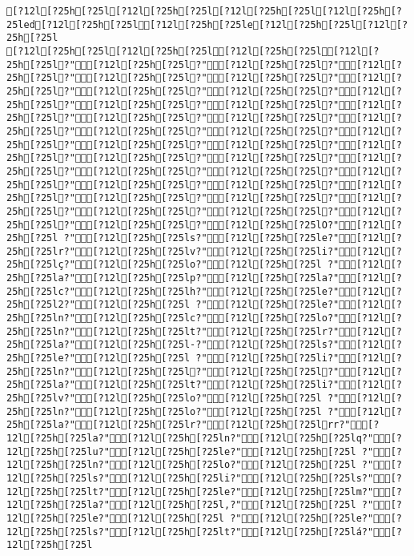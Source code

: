 \documentclass{scrartcl}
\begin{document}
\begin{Verbatim}
[?12l[?25h[?25l[?12l[?25h[?25l[?12l[?25h[?25l[?12l[?25h[?25led[?12l[?25h[?25l[?12l[?25h[?25le[?12l[?25h[?25l[?12l[?25h[?25l
[?12l[?25h[?25l[?12l[?25h[?25l[?12l[?25h[?25l[?12l[?25h[?25l?"[?12l[?25h[?25l?"[?12l[?25h[?25l?"[?12l[?25h[?25l?"[?12l[?25h[?25l?"[?12l[?25h[?25l?"[?12l[?25h[?25l?"[?12l[?25h[?25l?"[?12l[?25h[?25l?"[?12l[?25h[?25l?"[?12l[?25h[?25l?"[?12l[?25h[?25l?"[?12l[?25h[?25l?"[?12l[?25h[?25l?"[?12l[?25h[?25l?"[?12l[?25h[?25l?"[?12l[?25h[?25l?"[?12l[?25h[?25l?"[?12l[?25h[?25l?"[?12l[?25h[?25l?"[?12l[?25h[?25l?"[?12l[?25h[?25l?"[?12l[?25h[?25l?"[?12l[?25h[?25l?"[?12l[?25h[?25l?"[?12l[?25h[?25l?"[?12l[?25h[?25l?"[?12l[?25h[?25l?"[?12l[?25h[?25l?"[?12l[?25h[?25l?"[?12l[?25h[?25l?"[?12l[?25h[?25l?"[?12l[?25h[?25l?"[?12l[?25h[?25l?"[?12l[?25h[?25l?"[?12l[?25h[?25l?"[?12l[?25h[?25l?"[?12l[?25h[?25l?"[?12l[?25h[?25lO?"[?12l[?25h[?25l ?"[?12l[?25h[?25ls?"[?12l[?25h[?25le?"[?12l[?25h[?25lr?"[?12l[?25h[?25lv?"[?12l[?25h[?25li?"[?12l[?25h[?25lç?"[?12l[?25h[?25lo?"[?12l[?25h[?25l ?"[?12l[?25h[?25la?"[?12l[?25h[?25lp?"[?12l[?25h[?25la?"[?12l[?25h[?25lc?"[?12l[?25h[?25lh?"[?12l[?25h[?25le?"[?12l[?25h[?25l2?"[?12l[?25h[?25l ?"[?12l[?25h[?25le?"[?12l[?25h[?25ln?"[?12l[?25h[?25lc?"[?12l[?25h[?25lo?"[?12l[?25h[?25ln?"[?12l[?25h[?25lt?"[?12l[?25h[?25lr?"[?12l[?25h[?25la?"[?12l[?25h[?25l-?"[?12l[?25h[?25ls?"[?12l[?25h[?25le?"[?12l[?25h[?25l ?"[?12l[?25h[?25li?"[?12l[?25h[?25ln?"[?12l[?25h[?25l?"[?12l[?25h[?25l?"[?12l[?25h[?25la?"[?12l[?25h[?25lt?"[?12l[?25h[?25li?"[?12l[?25h[?25lv?"[?12l[?25h[?25lo?"[?12l[?25h[?25l ?"[?12l[?25h[?25ln?"[?12l[?25h[?25lo?"[?12l[?25h[?25l ?"[?12l[?25h[?25la?"[?12l[?25h[?25lr?"[?12l[?25h[?25lrr?"[?12l[?25h[?25la?"[?12l[?25h[?25ln?"[?12l[?25h[?25lq?"[?12l[?25h[?25lu?"[?12l[?25h[?25le?"[?12l[?25h[?25l ?"[?12l[?25h[?25ln?"[?12l[?25h[?25lo?"[?12l[?25h[?25l ?"[?12l[?25h[?25ls?"[?12l[?25h[?25li?"[?12l[?25h[?25ls?"[?12l[?25h[?25lt?"[?12l[?25h[?25le?"[?12l[?25h[?25lm?"[?12l[?25h[?25la?"[?12l[?25h[?25l,?"[?12l[?25h[?25l ?"[?12l[?25h[?25le?"[?12l[?25h[?25l ?"[?12l[?25h[?25le?"[?12l[?25h[?25ls?"[?12l[?25h[?25lt?"[?12l[?25h[?25lá?"[?12l[?25h[?25l 
\end{Verbatim}
\end{document}
